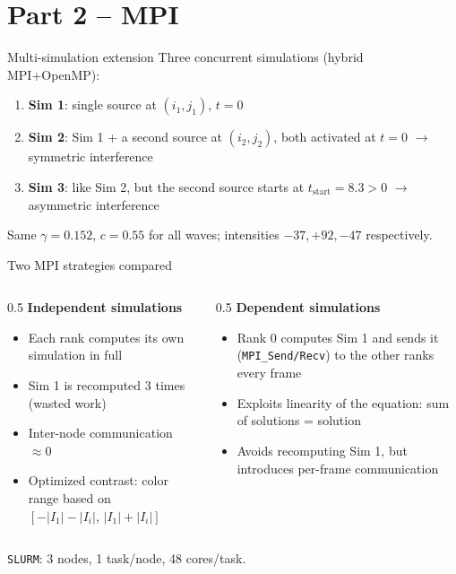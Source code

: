 \documentclass[11pt,aspectratio=169]{beamer}
\begin{document}
\section{Part 2 -- MPI}

\begin{frame}{Multi-simulation extension}
  Three concurrent simulations (hybrid MPI+OpenMP):
  \begin{enumerate}
    \item \textbf{Sim 1}: single source at $(i_1,j_1)$, $t=0$
    \item \textbf{Sim 2}: Sim 1 + a second source at $(i_2,j_2)$, both
      activated at $t=0$ $\to$ symmetric interference
    \item \textbf{Sim 3}: like Sim 2, but the second source starts at
      $t_{\text{start}}=8.3 > 0$ $\to$ asymmetric interference
  \end{enumerate}
  \vspace{0.2cm}
  Same $\gamma=0.152$, $c=0.55$ for all waves; intensities
  $-37, +92, -47$ respectively.
\end{frame}

\begin{frame}{Two MPI strategies compared}
  \begin{columns}
    \begin{column}{0.5\textwidth}
      \textbf{Independent simulations}
      \begin{itemize}
        \item Each rank computes its own simulation in full
        \item Sim 1 is recomputed 3 times (wasted work)
        \item Inter-node communication $\approx 0$
        \item Optimized contrast: color range based on
          $[-|I_1|-|I_i|,\,|I_1|+|I_i|]$
      \end{itemize}
    \end{column}
    \begin{column}{0.5\textwidth}
      \textbf{Dependent simulations}
      \begin{itemize}
        \item Rank 0 computes Sim 1 and sends it
          (\texttt{MPI\_Send/Recv}) to the other ranks every frame
        \item Exploits linearity of the equation: sum of solutions
          = solution
        \item Avoids recomputing Sim 1, but introduces per-frame
          communication
      \end{itemize}
    \end{column}
  \end{columns}
  \vspace{1cm}
  \centering
  \small \texttt{SLURM}: 3 nodes, 1 task/node, 48 cores/task.
\end{frame}
\end{document}
